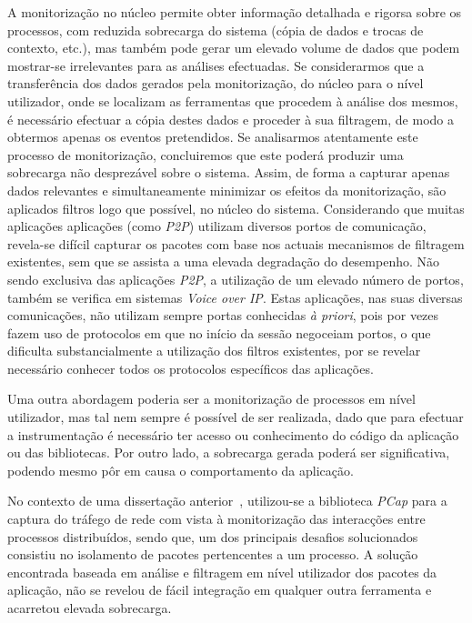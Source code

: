 A monitorização no núcleo permite obter informação detalhada e rigorsa sobre os processos, com reduzida sobrecarga do sistema (cópia de dados e trocas de contexto, etc.), mas também pode gerar um elevado volume de dados que podem mostrar-se irrelevantes para as análises efectuadas.
Se considerarmos que a transferência dos dados gerados pela monitorização, do núcleo para o nível utilizador, onde se localizam as ferramentas que procedem à análise dos mesmos, é necessário efectuar a cópia destes dados e proceder à sua filtragem, de modo a obtermos apenas os eventos pretendidos.
Se analisarmos atentamente este processo de monitorização, concluiremos que este poderá produzir uma sobrecarga não desprezável sobre o sistema.
Assim, de forma a capturar apenas dados relevantes e simultaneamente minimizar os efeitos da monitorização, são aplicados filtros logo que possível, no núcleo do sistema.
Considerando que muitas aplicações aplicações (como \textit{P2P}) utilizam diversos portos de comunicação, revela-se difícil capturar os pacotes com base nos actuais mecanismos de filtragem existentes, sem que se assista a uma elevada degradação do desempenho.
Não sendo exclusiva das aplicações \textit{P2P}, a utilização de um elevado número de portos, também se verifica em sistemas \textit{Voice over IP}.
Estas aplicações, nas suas diversas comunicações, não utilizam sempre portas conhecidas \textit{à priori}, pois por vezes fazem uso de protocolos em que no início da sessão negoceiam portos, o que dificulta substancialmente a utilização dos filtros existentes, por se revelar necessário conhecer todos os protocolos específicos das aplicações.


Uma outra abordagem poderia ser a monitorização de processos em nível utilizador, mas tal nem sempre é possível de ser realizada, dado que para efectuar a instrumentação é necessário ter acesso ou conhecimento do código da aplicação ou das bibliotecas.
Por outro lado, a sobrecarga gerada poderá ser significativa, podendo mesmo pôr em causa o comportamento da aplicação.

No contexto de uma dissertação anterior~\cite{Farruca:2009}, utilizou-se a biblioteca \textit{PCap} para a captura do tráfego de rede com vista à monitorização das interacções entre processos distribuídos, sendo que, um dos principais desafios solucionados consistiu no isolamento de pacotes pertencentes a um processo.
A solução encontrada baseada em análise e filtragem em nível utilizador dos pacotes da aplicação, não se revelou de fácil integração em qualquer outra ferramenta e acarretou elevada sobrecarga.

